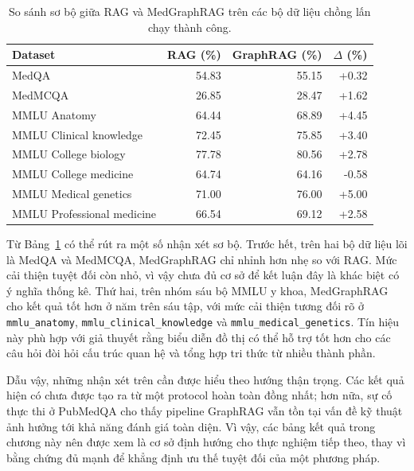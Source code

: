 \documentclass[a4paper,12pt,twoside]{report}
\begin{document}
\begin{table}[H]
  \centering
  \caption{So sánh sơ bộ giữa RAG và MedGraphRAG trên các bộ dữ liệu chồng lấn chạy thành công.}
  \label{tab:delta_compare}
  \begin{tabular}{@{}lrrr@{}}
    \toprule
    \textbf{Dataset} & \textbf{RAG (\%)} & \textbf{GraphRAG (\%)} & \(\Delta\) (\%) \\
    \midrule
    MedQA & 54.83 & 55.15 & +0.32 \\
    MedMCQA & 26.85 & 28.47 & +1.62 \\
    MMLU Anatomy & 64.44 & 68.89 & +4.45 \\
    MMLU Clinical knowledge & 72.45 & 75.85 & +3.40 \\
    MMLU College biology & 77.78 & 80.56 & +2.78 \\
    MMLU College medicine & 64.74 & 64.16 & -0.58 \\
    MMLU Medical genetics & 71.00 & 76.00 & +5.00 \\
    MMLU Professional medicine & 66.54 & 69.12 & +2.58 \\
    \bottomrule
  \end{tabular}
\end{table}

Từ Bảng~\ref{tab:delta_compare} có thể rút ra một số nhận xét sơ bộ. Trước hết, trên hai bộ dữ liệu lõi là MedQA và MedMCQA, MedGraphRAG chỉ nhỉnh hơn nhẹ so với RAG. Mức cải thiện tuyệt đối còn nhỏ, vì vậy chưa đủ cơ sở để kết luận đây là khác biệt có ý nghĩa thống kê. Thứ hai, trên nhóm sáu bộ MMLU y khoa, MedGraphRAG cho kết quả tốt hơn ở năm trên sáu tập, với mức cải thiện tương đối rõ ở \texttt{mmlu\_anatomy}, \texttt{mmlu\_clinical\_knowledge} và \texttt{mmlu\_medical\_genetics}. Tín hiệu này phù hợp với giả thuyết rằng biểu diễn đồ thị có thể hỗ trợ tốt hơn cho các câu hỏi đòi hỏi cấu trúc quan hệ và tổng hợp tri thức từ nhiều thành phần.

Dẫu vậy, những nhận xét trên cần được hiểu theo hướng thận trọng. Các kết quả hiện có chưa được tạo ra từ một protocol hoàn toàn đồng nhất; hơn nữa, sự cố thực thi ở PubMedQA cho thấy pipeline GraphRAG vẫn tồn tại vấn đề kỹ thuật ảnh hưởng tới khả năng đánh giá toàn diện. Vì vậy, các bảng kết quả trong chương này nên được xem là cơ sở định hướng cho thực nghiệm tiếp theo, thay vì bằng chứng đủ mạnh để khẳng định ưu thế tuyệt đối của một phương pháp.
\end{document}
